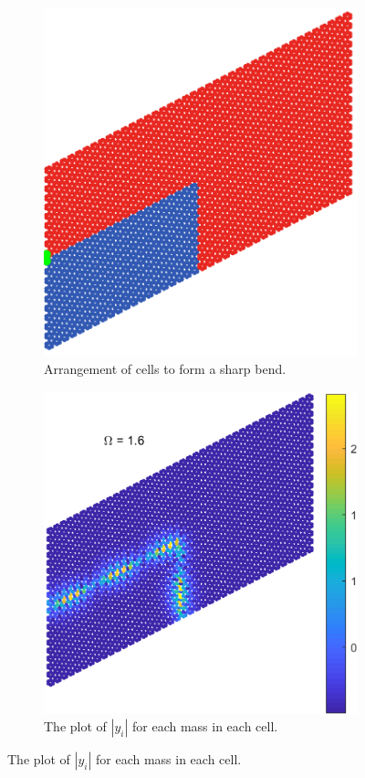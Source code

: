 \begin{figure}
\centering
\begin{subfigure}[b]{.5\textwidth}
  \centering
  \includegraphics[width=0.8\linewidth]{imgs/sharpbendarr.png}
  \caption{Arrangement of cells to form a sharp bend.}
  \label{fig:sub1}
\end{subfigure}%
\begin{subfigure}[b]{.5\textwidth}
  \centering
  \includegraphics[width=1\linewidth]{imgs/sharpbendscat.png}
  \caption{The plot of $|y_i|$ for each mass in each cell.}
  \label{fig:sub2}
\end{subfigure}


\end{figure}

